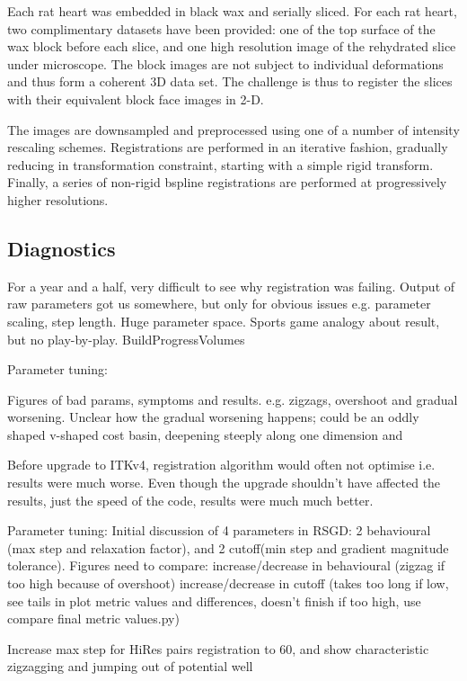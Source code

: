   Each rat heart was embedded in black wax and serially sliced. For each rat heart, two complimentary datasets have been provided: one of the top surface of the wax block before each slice, and one high resolution image of the rehydrated slice under microscope. The block images are not subject to individual deformations and thus form a coherent 3D data set. The challenge is thus to register the slices with their equivalent block face images in 2-D.
  
  The images are downsampled and preprocessed using one of a number of intensity rescaling schemes. Registrations are performed in an iterative fashion, gradually reducing in transformation constraint, starting with a simple rigid transform. Finally, a series of non-rigid bspline registrations are performed at progressively higher resolutions.
   
    \subsection{Diagnostics} %
    \label{sub:diagnostics}
      For a year and a half, very difficult to see why registration was failing. Output of raw parameters got us somewhere, but only for obvious issues e.g. parameter scaling, step length. Huge parameter space. Sports game analogy about result, but no play-by-play. BuildProgressVolumes
      
      Parameter tuning:
      
      Figures of bad params, symptoms and results. e.g. zigzags, overshoot and gradual worsening. Unclear how the gradual worsening happens; could be an oddly shaped v-shaped cost basin, deepening steeply along one dimension and 
      
      Before upgrade to ITKv4, registration algorithm would often not optimise i.e. results were much worse. Even though the upgrade shouldn't have affected the results, just the speed of the code, results were much much better.
      
      Parameter tuning:
      Initial discussion of 4 parameters in RSGD: 2 behavioural (max step and relaxation factor), and 2 cutoff(min step and gradient magnitude tolerance).
      Figures need to compare:
        increase/decrease in behavioural (zigzag if too high because of overshoot)
      increase/decrease in cutoff (takes too long if low, see tails in plot metric values and differences, doesn't finish if too high, use compare final metric values.py)

      Increase max step for HiRes pairs registration to 60, and show characteristic zigzagging and jumping out of potential well

